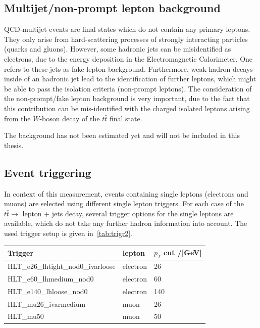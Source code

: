 \subsection{Multijet/non-prompt lepton background}
QCD-multijet events are final states which do not contain any primary leptons. They only arise from hard-scattering processes of strongly interacting particles (quarks and gluons). However, some hadronic jets can be misidentified as electrons, due to the energy deposition in the Electromagnetic Calorimeter. One refers to these jets as fake-lepton background. Furthermore, weak hadron decays inside of an hadronic jet lead to the identification of further leptons, which might be able to pass the isolation criteria (non-prompt leptons).
The consideration of the non-prompt/fake lepton background is very important, due to the fact that this contribution can be mis-identified with the charged isolated leptons arising from the $W$-boson decay of the $t\bar{t}$ final state.

The background has not been estimated yet and will not be included in this thesis.
 
 

 \subsection{Event triggering}
 In context of this measurement, events containing single leptons (electrons and muons) are selected using different single lepton triggers.
 For each case of the $t\bar{t} \rightarrow$ lepton + jets decay, several  trigger options for the single leptons are available, which do not take any further hadron information into account. The used trigger setup is given in~\cref{tab:trigr2}.
 

 \begin{center}
 	\label{tab:trigr2}
 	
 	
 	
 	\vspace{0.3cm}	
 	
 	
 	\begin{tabular}{>{}m{7.0cm}>{}m{3.0cm}>{}m{3.0cm}} \toprule
 			Trigger&  lepton&$p_T$ cut /[GeV]\\
 			\midrule
 		
 		HLT\_e26\_lhtight\_nod0\_ivarloose& electron&  26\\
 		HLT\_e60\_lhmedium\_nod0  & electron&  60 \\
 		HLT\_e140\_lhloose\_nod0& electron &140\\
		HLT\_mu26\_ivarmedium & muon & 26\\
		HLT\_mu50 & muon & 50\\
 	

 		
 		\bottomrule
 	\end{tabular}
 	
 \end{center}
 
